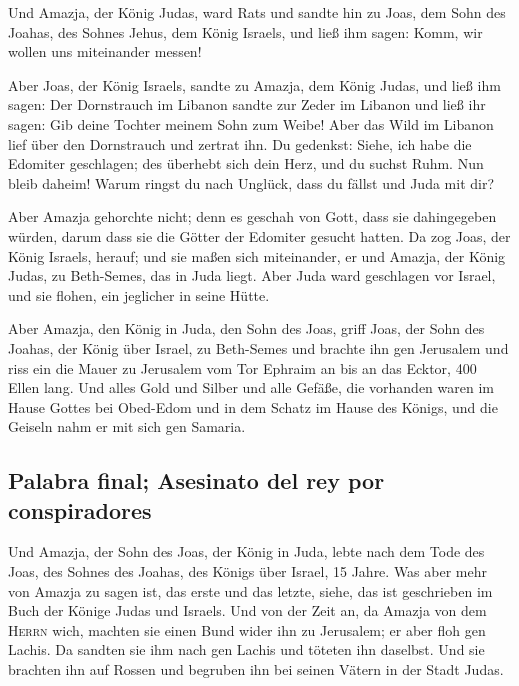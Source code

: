 Und Amazja, der König Judas, ward Rats und sandte hin zu
Joas, dem Sohn des Joahas, des Sohnes Jehus, dem König Israels, und ließ
ihm sagen: Komm, wir wollen uns miteinander messen!

 Aber Joas, der König Israels, sandte zu Amazja, dem
König Judas, und ließ ihm sagen: Der Dornstrauch im Libanon sandte zur
Zeder im Libanon und ließ ihr sagen: Gib deine Tochter meinem Sohn zum
Weibe! Aber das Wild im Libanon lief über den Dornstrauch und zertrat
ihn.  Du gedenkst: Siehe, ich habe die Edomiter
geschlagen; des überhebt sich dein Herz, und du suchst Ruhm. Nun bleib
daheim! Warum ringst du nach Unglück, dass du fällst und Juda mit dir?

 Aber Amazja gehorchte nicht; denn es geschah von Gott,
dass sie dahingegeben würden, darum dass sie die Götter der Edomiter
gesucht hatten.  Da zog Joas, der König Israels, herauf;
und sie maßen sich miteinander, er und Amazja, der König Judas, zu
Beth-Semes, das in Juda liegt.  Aber Juda ward geschlagen
vor Israel, und sie flohen, ein jeglicher in seine Hütte.

 Aber Amazja, den König in Juda, den Sohn des Joas, griff
Joas, der Sohn des Joahas, der König über Israel, zu Beth-Semes und
brachte ihn gen Jerusalem und riss ein die Mauer zu Jerusalem vom Tor
Ephraim an bis an das Ecktor, 400 Ellen lang.  Und alles
Gold und Silber und alle Gefäße, die vorhanden waren im Hause Gottes bei
Obed-Edom und in dem Schatz im Hause des Königs, und die Geiseln nahm er
mit sich gen Samaria.

\hypertarget{palabra-final-asesinato-del-rey-por-conspiradores}{%
\subsection{Palabra final; Asesinato del rey por
conspiradores}\label{palabra-final-asesinato-del-rey-por-conspiradores}}

 Und Amazja, der Sohn des Joas, der König in Juda, lebte
nach dem Tode des Joas, des Sohnes des Joahas, des Königs über Israel,
15 Jahre.  Was aber mehr von Amazja zu sagen ist, das
erste und das letzte, siehe, das ist geschrieben im Buch der Könige
Judas und Israels.  Und von der Zeit an, da Amazja von
dem \textsc{Herrn} wich, machten sie einen Bund wider ihn zu Jerusalem;
er aber floh gen Lachis. Da sandten sie ihm nach gen Lachis und töteten
ihn daselbst.  Und sie brachten ihn auf Rossen und
begruben ihn bei seinen Vätern in der Stadt Judas.

